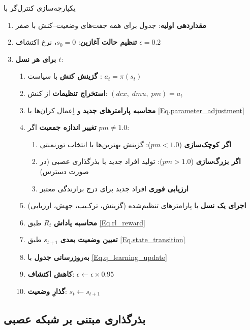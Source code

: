 \begin{algorithm}
\caption{یکپارچه‌سازی کنترل‌گر  با }
\begin{enumerate}
\item \textbf{مقداردهی اولیه}: جدول  برای همه جفت‌های وضعیت–کنش با صفر
\item \textbf{تنظیم حالت آغازین}: \(s_0 = 0\)، نرخ اکتشاف \(\epsilon = 0.2\)
\item \textbf{برای هر نسل \(t\)}:
  \begin{enumerate}
  \item \textbf{گزینش کنش} با سیاست : \(a_t = \pi(s_t)\)
  \item \textbf{استخراج تنظیمات} از کنش: \((dcx,\; dmu,\; pm) = a_t\)
  \item \textbf{محاسبه پارامترهای جدید} و اِعمال کران‌ها با \eqref{Eq.parameter_adjustment}
  \item \textbf{تغییر اندازه جمعیت} اگر \(pm \neq 1.0\):
    \begin{enumerate}
    \item \textbf{اگر کوچک‌سازی} (\(pm<1.0\)): گزینش بهترین‌ها با انتخاب تورنمنتی
    \item \textbf{اگر بزرگ‌سازی} (\(pm>1.0\)): تولید افراد جدید با بذرگذاری عصبی (در صورت دسترس)
    \item \textbf{ارزیابی فوری} افراد جدید برای درج برازندگی معتبر
    \end{enumerate}
  \item \textbf{اجرای یک نسل } با پارامترهای تنظیم‌شده (گزینش، ترکـیب، جهش، ارزیابی)
  \item \textbf{محاسبه پاداش} \(R_t\) طبق \eqref{Eq.rl_reward}
  \item \textbf{تعیین وضعیت بعدی} \(s_{t+1}\) طبق \eqref{Eq.state_transition}
  \item \textbf{به‌روزرسانی جدول } با \eqref{Eq.q_learning_update}
  \item \textbf{کاهش اکتشاف}: \(\epsilon \leftarrow \epsilon \times 0.95\)
  \item \textbf{گذارِ وضعیت}: \(s_t \leftarrow s_{t+1}\)
  \end{enumerate}
\end{enumerate}
\end{algorithm}

\subsection{بذرگذاری مبتنی بر شبکه عصبی}

